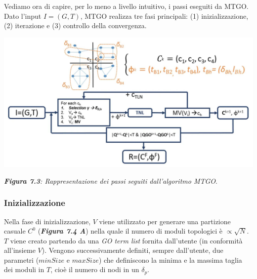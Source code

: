 \documentclass[11pt]{article}
\begin{document}
Vediamo ora di capire, per lo meno a livello intuitivo, i passi eseguiti da MTGO.
Dato l'input $I = (G,T)$, MTGO realizza tre fasi principali: (1) inizializzazione, (2) iterazione e (3) controllo della convergenza.

\begin{center}
\includegraphics[scale=0.4]{algMTGO}

\begin{small}\textit{\textbf{Figura 7.3}: Rappresentazione dei passi seguiti dall'algoritmo MTGO}.\end{small}
\end{center}

\subsubsection{Inizializzazione}
Nella fase di inizializzazione, $V$ viene utilizzato per generare una partizione casuale $C^0$ (\textit{\textbf{Figura 7.4 A}}) nella quale il numero di moduli topologici è $\propto \sqrt{N}$. $T$ viene creato partendo da una \textit{GO term list} fornita dall'utente (in conformità all'insieme $V$). Vengono successivamente definiti, sempre dall'utente, due parametri ($minSize$ e $maxSize$) che definiscono la minima e la massima taglia dei moduli in $T$, cioè il numero di nodi in un $\delta_p$.
\end{document}
